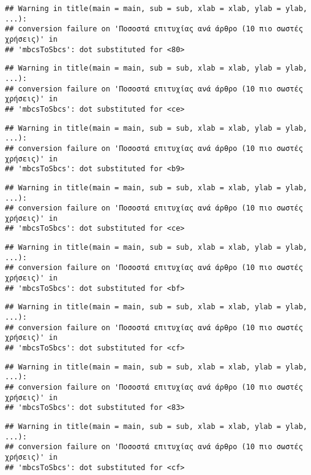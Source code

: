 \documentclass[
]{article}
\begin{document}
\begin{verbatim}
## Warning in title(main = main, sub = sub, xlab = xlab, ylab = ylab, ...):
## conversion failure on 'Ποσοστά επιτυχίας ανά άρθρο (10 πιο σωστές χρήσεις)' in
## 'mbcsToSbcs': dot substituted for <80>
\end{verbatim}

\begin{verbatim}
## Warning in title(main = main, sub = sub, xlab = xlab, ylab = ylab, ...):
## conversion failure on 'Ποσοστά επιτυχίας ανά άρθρο (10 πιο σωστές χρήσεις)' in
## 'mbcsToSbcs': dot substituted for <ce>
\end{verbatim}

\begin{verbatim}
## Warning in title(main = main, sub = sub, xlab = xlab, ylab = ylab, ...):
## conversion failure on 'Ποσοστά επιτυχίας ανά άρθρο (10 πιο σωστές χρήσεις)' in
## 'mbcsToSbcs': dot substituted for <b9>
\end{verbatim}

\begin{verbatim}
## Warning in title(main = main, sub = sub, xlab = xlab, ylab = ylab, ...):
## conversion failure on 'Ποσοστά επιτυχίας ανά άρθρο (10 πιο σωστές χρήσεις)' in
## 'mbcsToSbcs': dot substituted for <ce>
\end{verbatim}

\begin{verbatim}
## Warning in title(main = main, sub = sub, xlab = xlab, ylab = ylab, ...):
## conversion failure on 'Ποσοστά επιτυχίας ανά άρθρο (10 πιο σωστές χρήσεις)' in
## 'mbcsToSbcs': dot substituted for <bf>
\end{verbatim}

\begin{verbatim}
## Warning in title(main = main, sub = sub, xlab = xlab, ylab = ylab, ...):
## conversion failure on 'Ποσοστά επιτυχίας ανά άρθρο (10 πιο σωστές χρήσεις)' in
## 'mbcsToSbcs': dot substituted for <cf>
\end{verbatim}

\begin{verbatim}
## Warning in title(main = main, sub = sub, xlab = xlab, ylab = ylab, ...):
## conversion failure on 'Ποσοστά επιτυχίας ανά άρθρο (10 πιο σωστές χρήσεις)' in
## 'mbcsToSbcs': dot substituted for <83>
\end{verbatim}

\begin{verbatim}
## Warning in title(main = main, sub = sub, xlab = xlab, ylab = ylab, ...):
## conversion failure on 'Ποσοστά επιτυχίας ανά άρθρο (10 πιο σωστές χρήσεις)' in
## 'mbcsToSbcs': dot substituted for <cf>
\end{verbatim}
\end{document}

